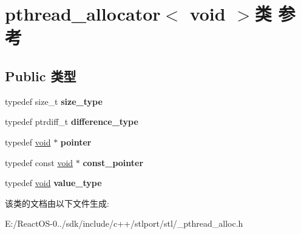\hypertarget{classpthread__allocator_3_01void_01_4}{}\section{pthread\+\_\+allocator$<$ void $>$类 参考}
\label{classpthread__allocator_3_01void_01_4}
\subsection*{Public 类型}
\begin{DoxyCompactItemize}
\item 
\mbox{\label{classpthread__allocator_3_01void_01_4_a09b4a8926e9b4dd0fb3f9a06f595d3f1}} 
typedef size\+\_\+t {\bfseries size\+\_\+type}
\item 
\mbox{\label{classpthread__allocator_3_01void_01_4_a18a888f3af4491c724dd8ebd8baddb28}} 
typedef ptrdiff\+\_\+t {\bfseries difference\+\_\+type}
\item 
\mbox{\label{classpthread__allocator_3_01void_01_4_a5fef4546a3ce1cd85518e036aedbb7a0}} 
typedef \hyperlink{interfacevoid}{void} $\ast$ {\bfseries pointer}
\item 
\mbox{\label{classpthread__allocator_3_01void_01_4_a9cf418c36cd67c8729d90767f4458a08}} 
typedef const \hyperlink{interfacevoid}{void} $\ast$ {\bfseries const\+\_\+pointer}
\item 
\mbox{\label{classpthread__allocator_3_01void_01_4_ac09d1d7a8e30fc416cb10c5b115b34dc}} 
typedef \hyperlink{interfacevoid}{void} {\bfseries value\+\_\+type}
\end{DoxyCompactItemize}


该类的文档由以下文件生成\+:\begin{DoxyCompactItemize}
\item 
E\+:/\+React\+O\+S-\/0../sdk/include/c++/stlport/stl/\+\_\+pthread\+\_\+alloc.\+h\end{DoxyCompactItemize}
